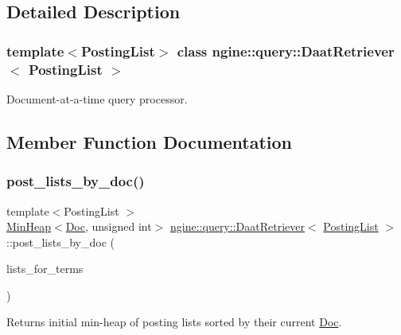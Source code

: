 \subsection{Detailed Description}
\subsubsection*{template$<$Posting\+List$>$\newline
class ngine\+::query\+::\+Daat\+Retriever$<$ Posting\+List $>$}

Document-\/at-\/a-\/time query processor. 

\subsection{Member Function Documentation}
\mbox{\label{classngine_1_1query_1_1DaatRetriever_ab6d86f821cc0755633d8c8cca9b0916a}} 
\subsubsection{\texorpdfstring{post\+\_\+lists\+\_\+by\+\_\+doc()}{post\_lists\_by\_doc()}}
{\footnotesize\ttfamily template$<$Posting\+List $>$ \\
\hyperlink{classngine_1_1MinHeap}{Min\+Heap}$<$\hyperlink{structngine_1_1Doc}{Doc}, unsigned int$>$ \hyperlink{classngine_1_1query_1_1DaatRetriever}{ngine\+::query\+::\+Daat\+Retriever}$<$ \hyperlink{classngine_1_1PostingList}{Posting\+List} $>$\+::post\+\_\+lists\+\_\+by\+\_\+doc (\begin{DoxyParamCaption}\item[{const std\+::vector$<$ \hyperlink{classngine_1_1PostingList}{Posting\+List} $>$ \&}]{lists\+\_\+for\+\_\+terms }\end{DoxyParamCaption})\hspace{0.3cm}{\ttfamily [inline]}}



Returns initial min-\/heap of posting lists sorted by their current \hyperlink{structngine_1_1Doc}{Doc}. 

\mbox{\label{classngine_1_1query_1_1DaatRetriever_a348228b0d8d52b38fee84482aa5093e8}} 
